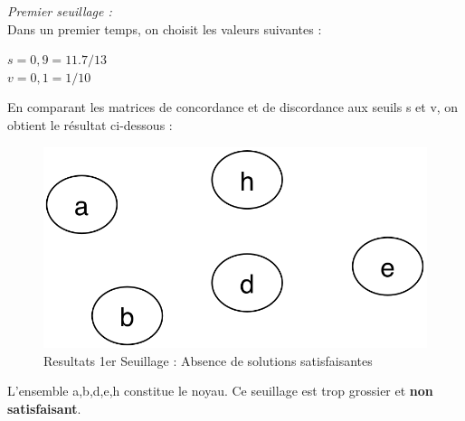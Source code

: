 \documentclass[a4paper, 11pt]{article}
\begin{document}
\emph{Premier seuillage :}\\
Dans un premier temps, on choisit les valeurs suivantes : 
\begin{center}
\textbf{$s = 0,9 = 11.7/13$\\
$v= 0,1 = 1/10$}
\end{center}
En comparant les matrices de concordance et de discordance aux seuils s et v, on obtient le résultat ci-dessous :\\
\begin{figure}[H]
   \begin{center}
        \includegraphics[scale=0.30]{../CR/src/Amine/1er.png}
        \caption{
           \label{fig} Resultats 1er Seuillage : Absence de solutions satisfaisantes
        }
    \end{center}
\end{figure}
L’ensemble {a,b,d,e,h} constitue le noyau. Ce seuillage est trop grossier et \textbf{non satisfaisant}.\\\\
\end{document}
